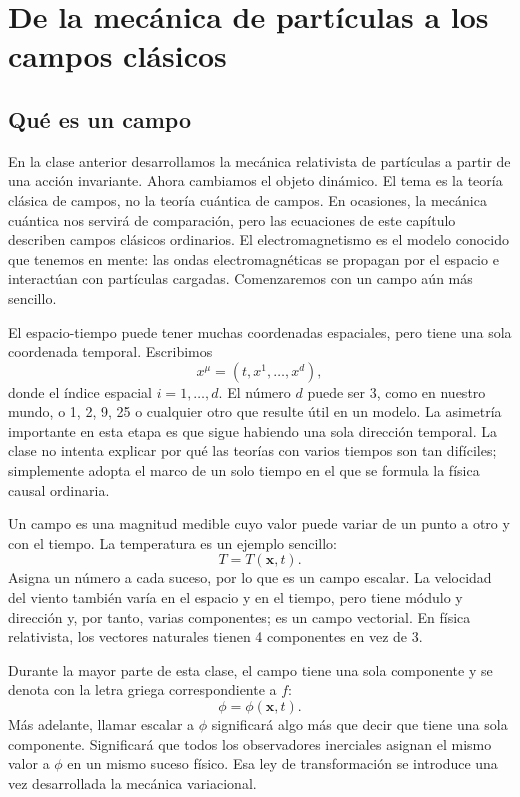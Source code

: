 \chapter{De la mecánica de partículas a los campos clásicos}

\section{Qué es un campo}

En la clase anterior desarrollamos la mecánica relativista de partículas a partir de una acción invariante. Ahora cambiamos el objeto dinámico. El tema es la teoría clásica de campos, no la teoría cuántica de campos. En ocasiones, la mecánica cuántica nos servirá de comparación, pero las ecuaciones de este capítulo describen campos clásicos ordinarios. El electromagnetismo es el modelo conocido que tenemos en mente: las ondas electromagnéticas se propagan por el espacio e interactúan con partículas cargadas. Comenzaremos con un campo aún más sencillo.

El espacio-tiempo puede tener muchas coordenadas espaciales, pero tiene una sola coordenada temporal. Escribimos
\begin{equation}
x^\mu=(t,x^1,\ldots,x^d),
\end{equation}
donde el índice espacial \(i=1,\ldots,d\). El número \(d\) puede ser 3, como en nuestro mundo, o 1, 2, 9, 25 o cualquier otro que resulte útil en un modelo. La asimetría importante en esta etapa es que sigue habiendo una sola dirección temporal. La clase no intenta explicar por qué las teorías con varios tiempos son tan difíciles; simplemente adopta el marco de un solo tiempo en el que se formula la física causal ordinaria.

Un campo es una magnitud medible cuyo valor puede variar de un punto a otro y con el tiempo. La temperatura es un ejemplo sencillo:
\begin{equation}
T=T(\mathbf{x},t).
\end{equation}
Asigna un número a cada suceso, por lo que es un campo escalar. La velocidad del viento también varía en el espacio y en el tiempo, pero tiene módulo y dirección y, por tanto, varias componentes; es un campo vectorial. En física relativista, los vectores naturales tienen 4 componentes en vez de 3.

Durante la mayor parte de esta clase, el campo tiene una sola componente y se denota con la letra griega correspondiente a \(f\):
\begin{equation}
\phi=\phi(\mathbf{x},t).
\label{eq:sr4-field-definition}
\end{equation}
Más adelante, llamar escalar a \(\phi\) significará algo más que decir que tiene una sola componente. Significará que todos los observadores inerciales asignan el mismo valor a \(\phi\) en un mismo suceso físico. Esa ley de transformación se introduce una vez desarrollada la mecánica variacional.

